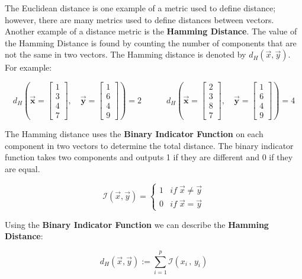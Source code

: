 The Euclidean distance is one example of a metric used to define distance; however, there are many metrics used to define distances between vectors. \\

Another example of a distance metric is the \textbf{Hamming Distance}. The value of the Hamming Distance is found by counting the number of components that are not the same in two vectors. The Hamming distance is denoted by $d_H (\vec{x},\vec{y})$. For example:

\[
d_H \left( \mathbf{\vec{x}} = 
\begin{bmatrix}
    1 \\
    3 \\
    4 \\
    7
\end{bmatrix}, 
\quad
\mathbf{\vec{y}} = 
\begin{bmatrix}
    1 \\
    6 \\
    4 \\
    9
\end{bmatrix} \right) = 2
\quad \quad \quad 
d_H \left( \mathbf{\vec{x}} = 
\begin{bmatrix}
    2 \\
    3 \\
    8 \\
    7
\end{bmatrix},
\quad
\mathbf{\vec{y}} = 
\begin{bmatrix}
    1 \\
    6 \\
    4 \\
    9
\end{bmatrix} \right) = 4
\]

The Hamming distance uses the \textbf{Binary Indicator Function} on each component in two vectors to determine the total distance. The binary indicator function takes two components and outputs 1 if they are different and 0 if they are equal.

\[
\mathcal{I}(\vec{x},\vec{y}) = 
\begin{cases}
    1 & if \; \vec{x} \neq \vec{y}\\
    0 & if \; \vec{x} = \vec{y}
\end{cases}
\]

Using the \textbf{Binary Indicator Function} we can describe the \textbf{Hamming Distance}:

\[
    d_H(\vec{x},\vec{y}):= \sum^p_{i=1} \mathcal{I}(x_i \, , \, y_i)
\]


